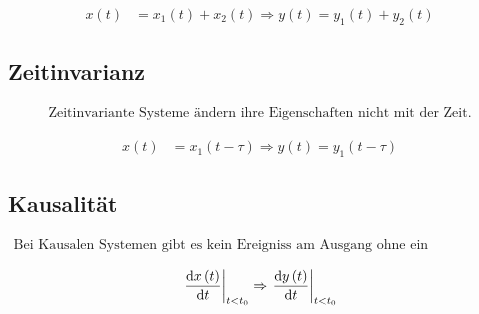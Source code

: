 \begin{boxleft}
\end{boxleft}\begin{boxrightshaded}
\begin{align*}
x\left(t\right)&= x_1\left(t\right)+x_2\left(t\right)\Rightarrow y\left(t\right)= y_1\left(t\right)+y_2\left(t\right)
\end{align*}
\end{boxrightshaded}


\subsection{Zeitinvarianz}

\begin{boxshaded}
\begin{align*}
\text{Zeitinvariante Systeme ändern ihre Eigenschaften nicht mit der Zeit.}
\end{align*}
\end{boxshaded}

\begin{boxleft}
\end{boxleft}\begin{boxrightshaded}
\begin{align*}
x\left(t\right)&=x_1\left(t-\tau\right)\Rightarrow y\left(t\right)=y_1\left(t-\tau\right)
\end{align*}
\end{boxrightshaded}


\subsection{Kausalität}

\begin{boxshaded}
\begin{align*}
\text{Bei Kausalen Systemen gibt es kein Ereigniss am Ausgang ohne ein entsprechendes Eingangssignal.}
\end{align*}
\end{boxshaded}

\begin{boxleft}
\end{boxleft}\begin{boxrightshaded}
\begin{align*}
\left.\frac{\mathop{}\!\mathrm{d} x\left(t\right)}{\mathop{}\!\mathrm{d} t}\right|_{t<t_0}\Rightarrow\left.\frac{\mathop{}\!\mathrm{d} y\left(t\right)}{\mathop{}\!\mathrm{d} t}\right|_{t<t_0}
\end{align*}
\end{boxrightshaded}

